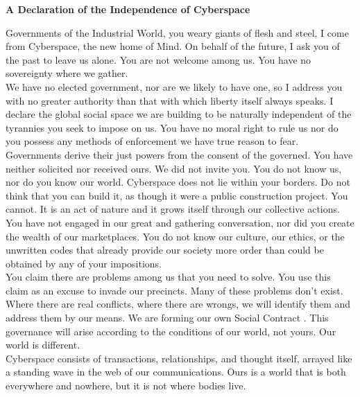 \documentclass[11pt,twoside,a4paper]{book}
\begin{document}
\begin{center} \begin{minipage}[ht]{0.95\textwidth}
	\footnotesize
	\textbf{\large A Declaration of the Independence of Cyberspace} %
	
	Governments of the Industrial World, you weary giants of flesh and steel, I come from Cyberspace, the new home of Mind. On behalf of the future, I ask you of the past to leave us alone. You are not welcome among us. You have no sovereignty where we gather. ~\\
	
	We have no elected government, nor are we likely to have one, so I address you with no greater authority than that with which liberty itself always speaks. I declare the global social space we are building to be naturally independent of the tyrannies you seek to impose on us. You have no moral right to rule us nor do you possess any methods of enforcement we have true reason to fear. ~\\
	
	Governments derive their just powers from the consent of the governed. You have neither solicited nor received ours. We did not invite you. You do not know us, nor do  you know our world. Cyberspace does not lie within your borders. Do not think that you can build it, as though it were a public construction project. You cannot. It is an act of nature and it grows itself through our collective actions. ~\\
	
	You have not engaged in our great and gathering conversation, nor did you create the wealth of our marketplaces. You do not know our culture, our ethics, or the unwritten codes that already provide our society more order than could be obtained by any of your impositions. ~\\
	
	You claim there are problems among us that you need to solve. You use this claim as an excuse to invade our precincts. Many of these problems don't exist. Where there are real conflicts, where there are wrongs, we will identify them and address them by our means. We are forming our own Social Contract . This governance will arise according to the conditions of our world, not yours. Our world is different. ~\\
	
	Cyberspace consists of transactions, relationships, and thought itself, arrayed like a standing wave in the web of our communications.  Ours is a world that is both everywhere and nowhere, but it is not where bodies live. ~\\
	

\end{minipage}
\end{center}
\end{document}
